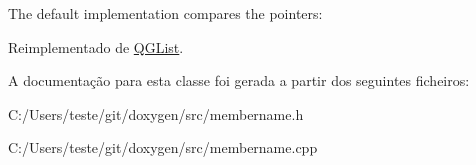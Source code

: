 The default implementation compares the pointers\-: 
\begin{DoxyCode}
\end{DoxyCode}
 

Reimplementado de \hyperlink{class_q_g_list_aac689c6d7a54b6558afbd53845183af8}{Q\-G\-List}.



A documentação para esta classe foi gerada a partir dos seguintes ficheiros\-:\begin{DoxyCompactItemize}
\item 
C\-:/\-Users/teste/git/doxygen/src/membername.\-h\item 
C\-:/\-Users/teste/git/doxygen/src/membername.\-cpp\end{DoxyCompactItemize}
